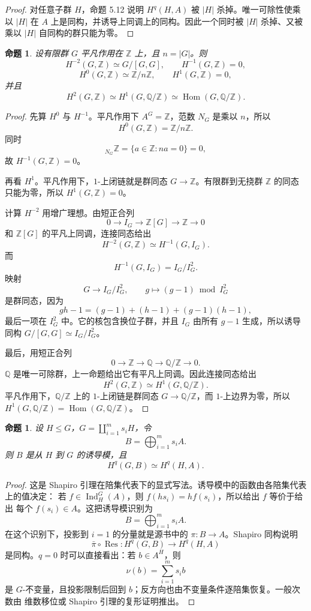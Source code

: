 \documentclass[11pt,a4paper,openany]{ctexbook}
\numberwithin{equation}{chapter}
\newcommand{\Q}{\mathbb{Q}}
\newcommand{\Z}{\mathbb{Z}}
\theoremstyle{plain}
\newtheorem{proposition}[theorem]{命题}
\theoremstyle{definition}
\theoremstyle{remark}
\begin{document}
\begin{proof}
对任意子群 $H$，命题 5.12 说明 $H^q(H,A)$ 被 $|H|$ 杀掉。唯一可除性使乘以 $|H|$ 在 $A$ 上是同构，并诱导上同调上的同构。因此一个同时被 $|H|$ 杀掉、又被乘以 $|H|$ 自同构的群只能为零。
\end{proof}

\begin{proposition}
设有限群 $G$ 平凡作用在 $\Z$ 上，且 $n=|G|$。则
\[
H^{-2}(G,\Z)\simeq G/[G,G],\qquad H^{-1}(G,\Z)=0,
\]
\[
H^0(G,\Z)\simeq \Z/n\Z,\qquad H^1(G,\Z)=0,
\]
并且
\[
H^2(G,\Z)\simeq H^1(G,\Q/\Z)\simeq\operatorname{Hom}(G,\Q/\Z).
\]
\end{proposition}

\begin{proof}
先算 $H^0$ 与 $H^{-1}$。平凡作用下 $A^G=\Z$，范数 $N_G$ 是乘以 $n$，所以
\[
H^0(G,\Z)=\Z/n\Z.
\]
同时
\[
{}_{N_G}\Z=\{a\in\Z:na=0\}=0,
\]
故 $H^{-1}(G,\Z)=0$。

再看 $H^1$。平凡作用下，$1$-上闭链就是群同态 $G\to\Z$。有限群到无挠群 $\Z$ 的同态
只能为零，所以 $H^1(G,\Z)=0$。

计算 $H^{-2}$ 用增广理想。由短正合列
\[
0\to I_G\to \Z[G]\to\Z\to0
\]
和 $\Z[G]$ 的平凡上同调，连接同态给出
\[
H^{-2}(G,\Z)\simeq H^{-1}(G,I_G).
\]
而
\[
H^{-1}(G,I_G)=I_G/I_G^2.
\]
映射
\[
G\longrightarrow I_G/I_G^2,\qquad g\longmapsto (g-1)\bmod I_G^2
\]
是群同态，因为
\[
gh-1=(g-1)+(h-1)+(g-1)(h-1),
\]
最后一项在 $I_G^2$ 中。它的核包含换位子群，并且 $I_G$ 由所有 $g-1$ 生成，所以诱导同构
$G/[G,G]\simeq I_G/I_G^2$。

最后，用短正合列
\[
0\to\Z\to\Q\to\Q/\Z\to0.
\]
$\Q$ 是唯一可除群，上一命题给出它有平凡上同调。因此连接同态给出
\[
H^2(G,\Z)\simeq H^1(G,\Q/\Z).
\]
平凡作用下，$\Q/\Z$ 上的 $1$-上闭链是群同态 $G\to\Q/\Z$，而 $1$-上边界为零，所以
$H^1(G,\Q/\Z)=\operatorname{Hom}(G,\Q/\Z)$。
\end{proof}

\begin{proposition}
设 $H\le G$，$G=\coprod_{i=1}^m s_iH$，令
\[
 B=\bigoplus_{i=1}^m s_iA.
\]
则 $B$ 是从 $H$ 到 $G$ 的诱导模，且
\[
 H^q(G,B)\simeq H^q(H,A).
\]
\end{proposition}

\begin{proof}
这是 Shapiro 引理在陪集代表下的显式写法。诱导模中的函数由各陪集代表上的值决定：
若 $f\in\operatorname{Ind}_H^G(A)$，则 $f(hs_i)=hf(s_i)$，所以给出 $f$ 等价于给出
每个 $f(s_i)\in A$。这把诱导模识别为
\[
B=\bigoplus_{i=1}^m s_iA.
\]
在这个识别下，投影到 $i=1$ 的分量就是源书中的 $\pi:B\to A$。Shapiro 同构说明
\[
\bar\pi\circ\operatorname{Res}:H^q(G,B)\to H^q(H,A)
\]
是同构。$q=0$ 时可以直接看出：若 $b\in A^H$，则
\[
\nu(b)=\sum_{i=1}^m s_i b
\]
是 $G$-不变量，且投影限制后回到 $b$；反方向也由不变量条件逐陪集恢复。一般次数由
维数移位或 Shapiro 引理的复形证明推出。
\end{proof}
\end{document}

